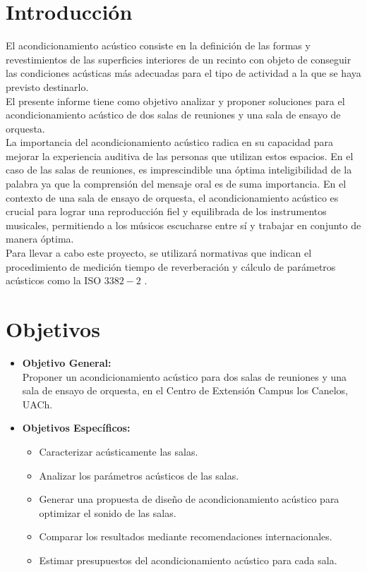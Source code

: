 \section{Introducción}
El acondicionamiento acústico consiste en la definición de las formas y revestimientos 
de las superficies interiores de un recinto con objeto de conseguir las condiciones acústicas más 
adecuadas para el tipo de actividad a la que se haya previsto destinarlo.\cite{carrion1990diseno} \\
El presente informe tiene como objetivo analizar y proponer soluciones para el acondicionamiento acústico 
de dos salas de reuniones y una sala de ensayo de orquesta. \\
\noindent
La importancia del acondicionamiento acústico radica en su capacidad para mejorar la experiencia auditiva 
de las personas que utilizan estos espacios. En el caso de las salas de reuniones, es imprescindible una óptima 
inteligibilidad de la palabra ya que la comprensión del mensaje oral es de suma importancia. \cite{carrion1990diseno}
En el contexto de una sala de ensayo de orquesta, el acondicionamiento acústico es crucial para lograr una reproducción 
fiel y equilibrada de los instrumentos musicales, permitiendo a los músicos escucharse entre sí y trabajar en conjunto 
de manera óptima. \\
\noindent
Para llevar a cabo este proyecto, se utilizará normativas que indican el procedimiento de medición tiempo de reverberación y cálculo de parámetros acústicos como la ISO $3382-2$ \cite{ISO3382-2}.

\section{Objetivos}
\begin{itemize}
    \item \textbf{Objetivo General:} \\
    Proponer un acondicionamiento acústico para dos salas de reuniones y una sala de ensayo de orquesta, en el Centro de Extensión Campus los Canelos, UACh.

    \item \textbf{Objetivos Específicos:}
    \begin{itemize}
        \item Caracterizar acústicamente las salas.
        \item Analizar los parámetros acústicos de las salas.
        \item Generar una propuesta de diseño de acondicionamiento acústico para optimizar el sonido de las salas.
        \item Comparar los resultados mediante recomendaciones internacionales. 
        \item Estimar presupuestos del acondicionamiento acústico para cada sala.

    \end{itemize}
\end{itemize}